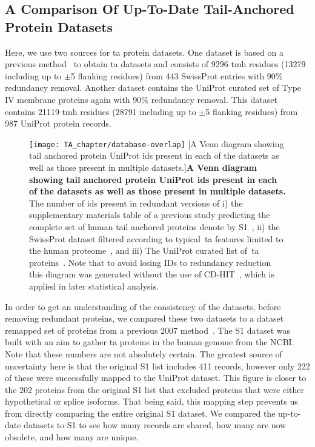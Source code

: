 \subsection{A Comparison Of Up-To-Date Tail-Anchored Protein Datasets}
Here, we use two sources for \gls{ta} protein datasets.
One dataset is based on a previous method~\cite{Kalbfleisch2007} to obtain \gls{ta} datasets and consists of 9296 \gls{tmh} residues (13279 including up to $\pm$5 flanking residues) from 443 SwissProt entries with 90\% redundancy removal.
Another dataset contains the UniProt curated set of Type IV membrane proteins again with 90\% redundancy removal.
This dataset contains 21119 \gls{tmh} residues (28791 including up to $\pm$5 flanking residues) from 987 UniProt protein records.

\begin{figure}[!ht]
\centering
\texttt{[image: TA\_chapter/database-overlap]}
		[A Venn diagram showing tail anchored protein UniProt ids present in each of the datasets as well as those present in multiple datasets.]{\textbf{A Venn diagram showing tail anchored protein UniProt ids present in each of the datasets as well as those present in multiple datasets.}
The number of ids present in redundant versions of
i) the supplementary materials table of a previous study predicting the complete set of human tail anchored proteins denote by S1~\cite{Kalbfleisch2007},
ii) the SwissProt dataset filtered according to typical~\gls{ta} features limited to the human proteome~\cite{TheUniProtConsortium2014}, and
iii) The UniProt curated list of~\gls{ta} proteins~\cite{TheUniProtConsortium2014}.
Note that to avoid losing IDs to redundancy reduction this diagram was generated without the use of CD-HIT~\cite{Huang2010, Wu2011}, which is applied in later statistical analysis.}

\label{fig:tadatasetoverlap}
\end{figure}

In order to get an understanding of the consistency of the datasets, before removing redundant proteins, we compared these two datasets to a dataset remapped set of proteins from a previous 2007 method~\cite{Kalbfleisch2007}.
The S1 dataset was built with an aim to gather \gls{ta} proteins in the human genome from the NCBI.
Note that these numbers are not absolutely certain.
The greatest source of uncertainty here is that the original S1 list includes 411 records, however only 222 of these were successfully mapped to the UniProt dataset.
This figure is closer to the 202 proteins from the original S1 list that excluded proteins that were either hypothetical or splice isoforms.
That being said, this mapping step prevents us from directly comparing the entire original S1 dataset.
We compared the up-to-date datasets to S1 to see how many records are shared, how many are now obsolete, and how many are unique.

